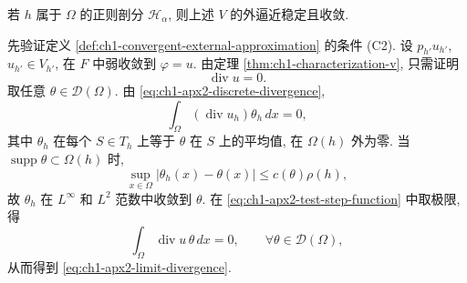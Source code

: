 \begin{Proposition}
\label{prop:ch1-apx2-stable-convergent}
若 $h$ 属于 $\Omega$ 的正则剖分 $\mathcal H_\alpha$, 则上述 $V$ 的外逼近稳定且收敛.
\end{Proposition}

\begin{Proof}
先验证定义 \ref{def:ch1-convergent-external-approximation} 的条件 (C2). 设 $p_{h'}u_{h'}$, $u_{h'}\in V_{h'}$, 在 $F$ 中弱收敛到 $\varphi=u$. 由定理 \ref{thm:ch1-characterization-v}, 只需证明
\begin{equation}
\operatorname{div}u=0.
\label{eq:ch1-apx2-limit-divergence}
\end{equation}
取任意 $\theta\in\mathcal D(\Omega)$. 由 \eqref{eq:ch1-apx2-discrete-divergence},
\begin{equation}
\int_\Omega(\operatorname{div}u_h)\theta_h\,dx=0,
\label{eq:ch1-apx2-test-step-function}
\end{equation}
其中 $\theta_h$ 在每个 $S\in T_h$ 上等于 $\theta$ 在 $S$ 上的平均值, 在 $\Omega(h)$ 外为零. 当 $\operatorname{supp}\theta\subset\Omega(h)$ 时,
\[
\sup_{x\in\Omega}|\theta_h(x)-\theta(x)|
\leq c(\theta)\rho(h),
\]
故 $\theta_h$ 在 $L^\infty$ 和 $L^2$ 范数中收敛到 $\theta$. 在 \eqref{eq:ch1-apx2-test-step-function} 中取极限, 得
\[
\int_\Omega\operatorname{div}u\,\theta\,dx=0,
\qquad\forall\theta\in\mathcal D(\Omega),
\]
从而得到 \eqref{eq:ch1-apx2-limit-divergence}.


\end{Proof}
